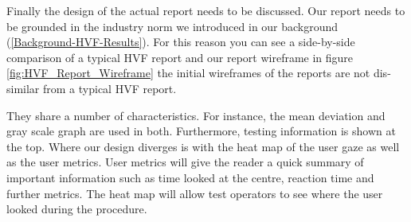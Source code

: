 \documentclass{l4proj}
\begin{document}
Finally the design of the actual report needs to be discussed. Our report needs to be grounded in the industry norm we introduced in our background (\ref{Background-HVF-Results}). For this reason you can see a side-by-side comparison of a typical HVF report and our report wireframe in figure \ref{fig:HVF_Report_Wireframe} the initial wireframes of the reports are not dis-similar from a typical HVF report. 

They share a number of characteristics. For instance, the mean deviation and gray scale graph are used in both. Furthermore, testing information is shown at the top. Where our design diverges is with the heat map of the user gaze as well as the user metrics. User metrics will give the reader a quick summary of important information such as time looked at the centre, reaction time and further metrics. The heat map will allow test operators to see where the user looked during the procedure.
\end{document}
